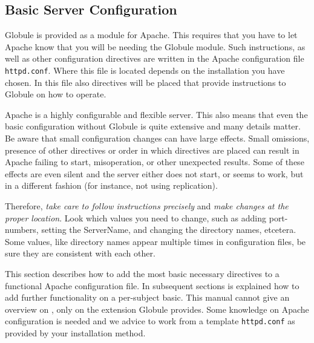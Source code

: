\documentclass[10pt,a4paper]{article}
\makeatletter
\newenvironment{p}{\@open{P}{}}{\@close{P}}
\newenvironment{p}{}{\par}
\newcommand\subsectionbr{}
\makeatother
\begin{document}

\newpage
\subsection{\label{sec:conf:basic}
  Basic Server Configuration\subsectionbr}

\begin{p}
Globule is provided as a module for Apache.  This requires that you have to
let Apache know that you will be needing the Globule module.  Such
instructions, as well as other configuration directives are written in the
Apache configuration file \verb!httpd.conf!.  Where this file is located
depends on the installation you have chosen.  In this file also directives
will be placed that provide instructions to Globule on how to operate.
\end{p}

\begin{p}
Apache is a highly configurable and flexible server.  This also means that
even the basic configuration without Globule is quite extensive and many
details matter.  Be aware that small configuration changes can have large
effects.  Small omissions, presence of other directives or order in which
directives are placed can result in Apache failing to start, misoperation, or
other unexpected results.  Some of these effects are even silent and the
server either does not start, or seems to work, but in a different fashion
(for instance, not using replication).
\end{p}

\begin{p}
Therefore, \emph{take care to follow instructions precisely} and \emph{make
changes at the proper location}.  Look which values you need to change, such
as adding port-numbers, setting the ServerName, and changing the directory
names, etcetera.  Some values, like directory names appear multiple times in
configuration files, be sure they are consistent with each other.
\end{p}

\begin{p}
This section describes how to add the most basic necessary directives to a
functional Apache configuration file.  In subsequent sections is explained how
to add further functionality on a per-subject basic.  This manual cannot give
an overview on ,
only on the extension Globule provides.  Some knowledge on Apache
configuration is needed and we advice to work from a template
\verb!httpd.conf! as provided by your installation method.
\end{p}
\end{document}
